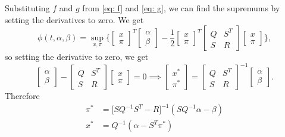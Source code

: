 Substituting $f$ and $g$ from \eqref{eq: f} and \eqref{eq: g}, we can find the supremums by setting the derivatives to zero. We get
\begin{equation*}
    \phi(t, \alpha, \beta) = \sup_{x, \pi} \bigg\{
    \begin{bmatrix}
        x\\
        \pi
    \end{bmatrix}^T
    \begin{bmatrix}
        \alpha\\
        \beta
    \end{bmatrix} - \frac12
    \begin{bmatrix}
        x\\
        \pi
    \end{bmatrix}^T
    \begin{bmatrix}
        Q & S^T\\
        S & R
    \end{bmatrix}
    \begin{bmatrix}
        x\\
        \pi
    \end{bmatrix}
    \bigg\},
\end{equation*}
so setting the derivative to zero, we get
\begin{equation*}
    \begin{bmatrix}
        \alpha\\
        \beta
    \end{bmatrix} - 
    \begin{bmatrix}
        Q & S^T\\
        S & R
    \end{bmatrix}
    \begin{bmatrix}
        x\\
        \pi
    \end{bmatrix}
    = 0 \implies 
    \begin{bmatrix}
        x^\ast\\
        \pi^\ast
    \end{bmatrix} = 
    \begin{bmatrix}
        Q & S^T\\
        S & R
    \end{bmatrix}^{-1}
    \begin{bmatrix}
        \alpha\\
        \beta
    \end{bmatrix}.
\end{equation*}
Therefore
\begin{align*}
    \pi^\ast &= \big[ S Q^{-1}S^T - R \big]^{-1}(S Q^{-1} \alpha - \beta)\\
    x^\ast &= Q^{-1} (\alpha - S^T \pi^\ast)
\end{align*}
